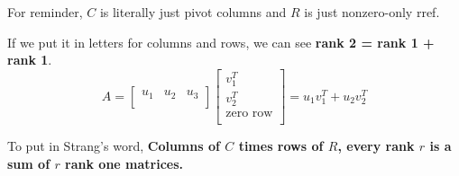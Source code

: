 For reminder, \(C\) is literally just pivot columns and \(R\) is just nonzero-only rref. 

If we put it in letters for columns and rows, we can see \textbf{rank 2 = rank 1 + rank 1}. 
\[
    A = 
    \begin{bmatrix}
        u_1 & u_2 & u_3  \\
    \end{bmatrix}
    \begin{bmatrix}
         v^{T}_1 \\
         v^{T}_2 \\
         \text{zero row} \\
    \end{bmatrix}
    = 
    u_{1}v^{T}_1 + u_{2}v^{T}_2
\] 

To put in Strang's word, \textbf{Columns of \(C\)  times rows of \(R\), every rank \(r\) is a sum of \(r\) rank one matrices.  }

